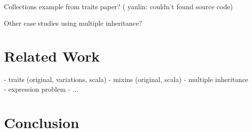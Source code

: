\documentclass[preprint]{llncs}
\newcommand{\authornote}[3]{{\color{#2} {\sc #1}: #3}}
\newcommand\yanlin[1]{\authornote{yanlin}{green}{#1}}
\begin{document}
Collections example from traits paper? 
(\yanlin{couldn't found source code})

Other case studies using multiple inheritance?

\section{Related Work}\label{sec:related}

- traits (original, variations, scala)
- mixins (original, scala)
- multiple inheritance 
- expression problem
- ...

\section{Conclusion}\label{sec:conclusion}





\appendix
\end{document}
